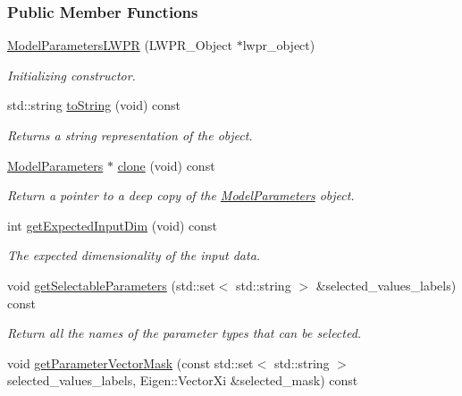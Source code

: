 \subsubsection*{Public Member Functions}
\begin{DoxyCompactItemize}
\item 
\hyperlink{classDmpBbo_1_1ModelParametersLWPR_ad165c0cc27bd223f57aba5d82fd8f0aa}{Model\+Parameters\+L\+W\+P\+R} (L\+W\+P\+R\+\_\+\+Object $\ast$lwpr\+\_\+object)
\begin{DoxyCompactList}\small\item\em Initializing constructor. \end{DoxyCompactList}\item 
std\+::string \hyperlink{classDmpBbo_1_1ModelParametersLWPR_a1aca816b42cf0d36118be0ab91120d77}{to\+String} (void) const 
\begin{DoxyCompactList}\small\item\em Returns a string representation of the object. \end{DoxyCompactList}\item 
\hyperlink{classDmpBbo_1_1ModelParameters}{Model\+Parameters} $\ast$ \hyperlink{classDmpBbo_1_1ModelParametersLWPR_a0a71d403a2e0560e058c03394648d773}{clone} (void) const 
\begin{DoxyCompactList}\small\item\em Return a pointer to a deep copy of the \hyperlink{classDmpBbo_1_1ModelParameters}{Model\+Parameters} object. \end{DoxyCompactList}\item 
int \hyperlink{classDmpBbo_1_1ModelParametersLWPR_af5a550bcf65d5a29a153a594cc4e3fa1}{get\+Expected\+Input\+Dim} (void) const 
\begin{DoxyCompactList}\small\item\em The expected dimensionality of the input data. \end{DoxyCompactList}\item 
void \hyperlink{classDmpBbo_1_1ModelParametersLWPR_a887f4747734bd8b7cc4f799092ff31b4}{get\+Selectable\+Parameters} (std\+::set$<$ std\+::string $>$ \&selected\+\_\+values\+\_\+labels) const 
\begin{DoxyCompactList}\small\item\em Return all the names of the parameter types that can be selected. \end{DoxyCompactList}\item 
void \hyperlink{classDmpBbo_1_1ModelParametersLWPR_a9dba1f93e426e7511630ec1ece4ace17}{get\+Parameter\+Vector\+Mask} (const std\+::set$<$ std\+::string $>$ selected\+\_\+values\+\_\+labels, Eigen\+::\+Vector\+Xi \&selected\+\_\+mask) const 

\end{DoxyCompactItemize}
